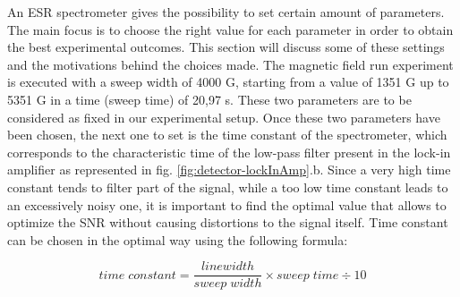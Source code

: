 \documentclass[journal]{IEEEtran}
\begin{document}
An ESR spectrometer gives the possibility to set certain amount of parameters. The main focus is to choose the right value for each parameter in order to obtain the best experimental outcomes. This section will discuss some of these settings and the motivations behind the choices made. The magnetic field run experiment is executed with a sweep width of 4000 G, starting from a value of 1351 G up to 5351 G in a time (sweep time) of 20,97 s. These two parameters are to be considered as fixed in our experimental setup.
Once these two parameters have been chosen, the next one to set is the time constant of the spectrometer, which corresponds to the characteristic time of the low-pass filter present in the lock-in amplifier as represented in fig. \ref{fig:detector-lockInAmp}.b. Since a very high time constant tends to filter part of the signal, while a too low time constant leads to an excessively noisy one, it is important to find the optimal value that allows to optimize the SNR without causing distortions to the signal itself. Time constant can be chosen in the optimal way using the following formula:

\begin{equation}
    time \; constant = \frac{linewidth}{sweep \; width} \times sweep \; time \div 10
\end{equation}
\end{document}
